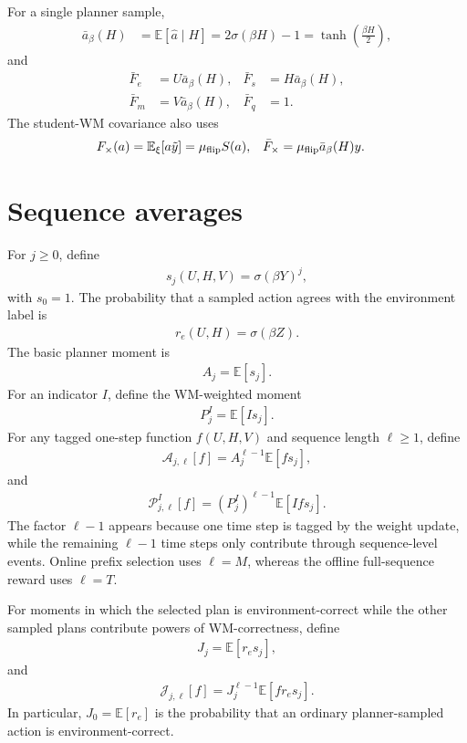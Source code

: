 \documentclass{article}
\begin{document}
For a single planner sample,
\begin{align}
\bar a_\beta(H) &= \mathbb E[\hat a\mid H]=2\sigma(\beta H)-1=\tanh\left(\frac{\beta H}{2}\right),
\end{align}
and
\begin{align}
\bar F_e &= U\bar a_\beta(H), & \bar F_s &= H\bar a_\beta(H), \\
\bar F_m &= V\bar a_\beta(H), & \bar F_q &= 1.
\end{align}
The student-WM covariance also uses
\begin{align}
F_\times(a) &= \mathbb E_\xi[a\tilde y]=\mu_{\rm flip}S(a), & \bar F_\times &= \mu_{\rm flip}\bar a_\beta(H)y.
\end{align}
\section{Sequence averages}

For $j\geq 0$, define
\begin{align}
s_j(U,H,V)=\sigma(\beta Y)^j,
\end{align}
with $s_0=1$. The probability that a sampled action agrees with the environment label is
\begin{align}
r_e(U,H)=\sigma(\beta Z).
\end{align}
The basic planner moment is
\begin{align}
A_j=\mathbb E[s_j].
\end{align}
For an indicator $I$, define the WM-weighted moment
\begin{align}
P_j^I=\mathbb E[I s_j].
\end{align}
For any tagged one-step function $f(U,H,V)$ and sequence length $\ell\geq1$, define
\begin{align}
\mathcal A_{j,\ell}[f] =A_j^{\ell-1}\mathbb E[f s_j],
\end{align}
and
\begin{align}
\mathcal P_{j,\ell}^I[f] =\left(P_j^I\right)^{\ell-1}\mathbb E[I f s_j].
\end{align}
The factor $\ell-1$ appears because one time step is tagged by the weight update, while the remaining $\ell-1$ time steps only contribute through sequence-level events. Online prefix selection uses $\ell=M$, whereas the offline full-sequence reward uses $\ell=T$.

For moments in which the selected plan is environment-correct while the other sampled plans contribute powers of WM-correctness, define
\begin{align}
J_j=\mathbb E[r_e s_j],
\end{align}
and
\begin{align}
\mathcal J_{j,\ell}[f] =J_j^{\ell-1}\mathbb E[f r_e s_j].
\end{align}
In particular, $J_0=\mathbb E[r_e]$ is the probability that an ordinary planner-sampled action is environment-correct.
\end{document}
